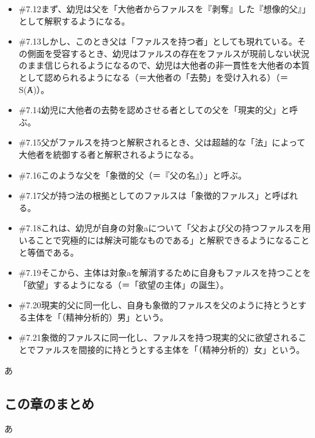 \begin{note}{}
\begin{itemize}
    \item{\#7.12}まず、幼児は父を「大他者からファルスを『剥奪』した『想像的父』」として解釈するようになる。
    \item{\#7.13}しかし、このとき父は「ファルスを持つ者」としても現れている。その側面を受容するとき、幼児はファルスの存在をファルスが現前しない状況のまま信じられるようになるので、幼児は大他者の非一貫性を大他者の本質として認められるようになる（＝大他者の「去勢」を受け入れる）（＝S(Ⱥ)）。
    \item{\#7.14}幼児に大他者の去勢を認めさせる者としての父を「現実的父」と呼ぶ。
    \item{\#7.15}父がファルスを持つと解釈されるとき、父は超越的な「法」によって大他者を統御する者と解釈されるようになる。
    \item{\#7.16}このような父を「象徴的父（＝『父の名』）」と呼ぶ。
    \item{\#7.17}父が持つ法の根拠としてのファルスは「象徴的ファルス」と呼ばれる。
    \item{\#7.18}これは、幼児が自身の対象aについて「父および父の持つファルスを用いることで究極的には解決可能なものである」と解釈できるようになることと等価である。
    \item{\#7.19}そこから、主体は対象aを解消するために自身もファルスを持つことを「欲望」するようになる（＝「欲望の主体」の誕生）。
    \item{\#7.20}現実的父に同一化し、自身も象徴的ファルスを父のように持とうとする主体を「（精神分析的）男」という。
    \item{\#7.21}象徴的ファルスに同一化し、ファルスを持つ現実的父に欲望されることでファルスを間接的に持とうとする主体を「（精神分析的）女」という。
  \end{itemize}
\end{note}

あ

\subsection{この章のまとめ}\label{ux3053ux306eux7ae0ux306eux307eux3068ux3081}

あ
